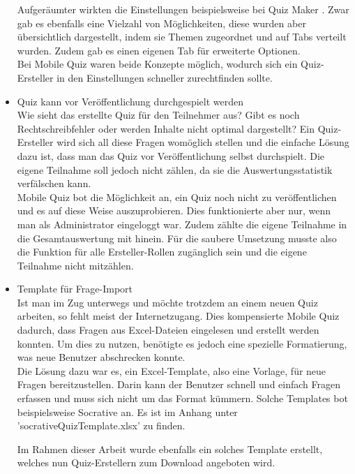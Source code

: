 \begin{itemize}
		Aufgeräumter wirkten die Einstellungen beispielsweise bei Quiz Maker \cite{quiz-maker}. Zwar gab es ebenfalls eine Vielzahl von Möglichkeiten, diese wurden aber übersichtlich dargestellt, indem sie Themen zugeordnet und auf Tabs verteilt wurden. Zudem gab es einen eigenen Tab für erweiterte Optionen. \\
		Bei Mobile Quiz waren beide Konzepte möglich, wodurch sich ein Quiz-Ersteller in den Einstellungen schneller zurechtfinden sollte.
		
		
		
		\item Quiz kann vor Veröffentlichung durchgespielt werden \\
		Wie sieht das erstellte Quiz für den Teilnehmer aus? Gibt es noch Rechtschreibfehler oder werden Inhalte nicht optimal dargestellt? Ein Quiz-Ersteller wird sich all diese Fragen womöglich stellen und die einfache Lösung dazu ist, dass man das Quiz vor Veröffentlichung selbst durchspielt. Die eigene Teilnahme soll jedoch nicht zählen, da sie die Auswertungsstatistik verfälschen kann. \\
		Mobile Quiz bot die Möglichkeit an, ein Quiz noch nicht zu veröffentlichen und es auf diese Weise auszuprobieren. Dies funktionierte aber nur, wenn man als Administrator eingeloggt war. Zudem zählte die eigene Teilnahme in die Gesamtauswertung mit hinein. Für die saubere Umsetzung musste also die Funktion für alle Ersteller-Rollen zugänglich sein und die eigene Teilnahme nicht mitzählen.
		
		
		
		\item Template für Frage-Import \\
		Ist man im Zug unterwegs und möchte trotzdem an einem neuen Quiz arbeiten, so fehlt meist der Internetzugang. Dies kompensierte Mobile Quiz dadurch, dass Fragen aus Excel-Dateien eingelesen und erstellt werden konnten. Um dies zu nutzen, benötigte es jedoch eine spezielle Formatierung, was neue Benutzer abschrecken konnte. \\
		Die Lösung dazu war es, ein Excel-Template, also eine Vorlage, für neue Fragen bereitzustellen. Darin kann der Benutzer schnell und einfach Fragen erfassen und muss sich nicht um das Format kümmern. Solche Templates bot beispielsweise
		Socrative \cite{socrative.com} an. Es ist im Anhang unter 'socrativeQuizTemplate.xlsx' zu finden.
		
		Im Rahmen dieser Arbeit wurde ebenfalls ein solches Template erstellt, welches nun Quiz-Erstellern zum Download angeboten wird.
		
	\end{itemize}	
	